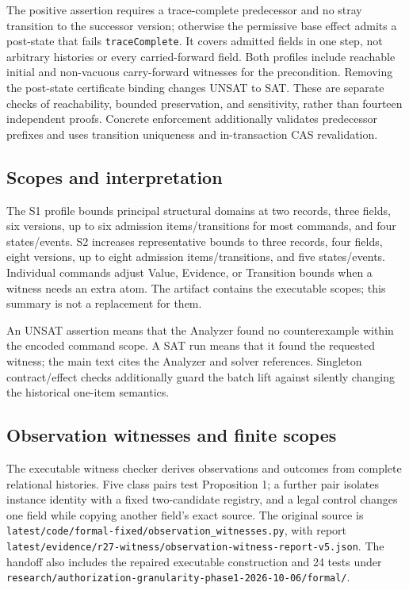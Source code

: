 \documentclass[11pt,a4paper]{article}
\newcommand{\code}[1]{\nolinkurl{#1}}
\begin{document}
The positive assertion requires a trace-complete predecessor and no stray transition to the successor version; otherwise the permissive base effect admits a post-state that fails \code{traceComplete}. It covers admitted fields in one step, not arbitrary histories or every carried-forward field. Both profiles include reachable initial and non-vacuous carry-forward witnesses for the precondition. Removing the post-state certificate binding changes UNSAT to SAT. These are separate checks of reachability, bounded preservation, and sensitivity, rather than fourteen independent proofs. Concrete enforcement additionally validates predecessor prefixes and uses transition uniqueness and in-transaction CAS revalidation.

\subsection{Scopes and interpretation}

The S1 profile bounds principal structural domains at two records, three fields, six versions, up to six admission items/transitions for most commands, and four states/events. S2 increases representative bounds to three records, four fields, eight versions, up to eight admission items/transitions, and five states/events. Individual commands adjust Value, Evidence, or Transition bounds when a witness needs an extra atom. The artifact contains the executable scopes; this summary is not a replacement for them.



An UNSAT assertion means that the Analyzer found no counterexample within the encoded command scope. A SAT run means that it found the requested witness; the main text cites the Analyzer and solver references. Singleton contract/effect checks additionally guard the batch lift against silently changing the historical one-item semantics.


\subsection{Observation witnesses and finite scopes}

The executable witness checker derives observations and outcomes from complete relational histories. Five class pairs test Proposition 1; a further pair isolates instance identity with a fixed two-candidate registry, and a legal control changes one field while copying another field's exact source. The original source is \code{latest/code/formal-fixed/observation_witnesses.py}, with report \code{latest/evidence/r27-witness/observation-witness-report-v5.json}. The handoff also includes the repaired executable construction and 24 tests under \code{research/authorization-granularity-phase1-2026-10-06/formal/}.
\end{document}
